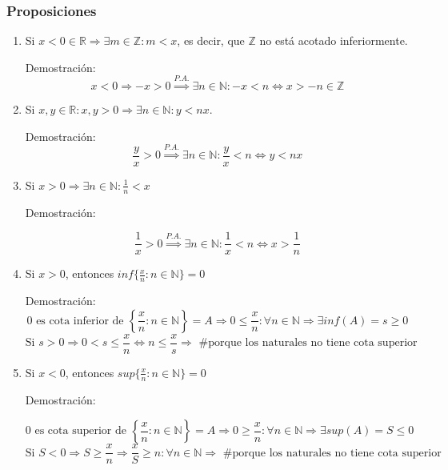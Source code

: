 \documentclass[10pt,a4paper,openright]{book}
\theoremstyle{break}
\begin{document}
\subsubsection{Proposiciones}
\begin{enumerate}
\item Si $x<0\in \mathbb R\Rightarrow \exists m\in \mathbb Z: m<x$, es decir, que $\mathbb Z$ no está acotado inferiormente.\par
Demostración:
$$x<0\Rightarrow -x>0\stackrel{P.A.}{\Rightarrow} \exists n \in \mathbb N: -x<n\Leftrightarrow x>-n\in \mathbb Z$$
\vspace{0.15cm}

\item Si $x,y\in \mathbb R: x,y>0\Rightarrow \exists n \in \mathbb N : y<nx$.\par
Demostración:
$$\frac{y}{x}>0\stackrel{P.A.}{\Rightarrow} \exists n \in \mathbb N : \frac{y}{x}<n \Leftrightarrow y<nx$$
\vspace{0.15cm}

\item Si $x>0\Rightarrow \exists n \in \mathbb N : \frac{1}{n}<x$\par
Demostración:\par
$$\frac{1}{x}>0\stackrel{P.A.}{\Rightarrow }\exists n \in \mathbb N : \frac{1}{x}<n\Leftrightarrow x>\frac{1}{n}$$			
\vspace{0.15cm}

\item Si $x>0$, entonces $inf\{\frac{x}{n}: n\in \mathbb N\}=0$\par
Demostración:
$$\mbox{0 es cota inferior de } \left\lbrace\frac{x}{n}: n\in \mathbb N\right\rbrace=A\Rightarrow 0\leq \frac{x}{n}: \forall n\in \mathbb N \Rightarrow \exists inf(A)=s\geq 0$$
$$\mbox{Si }s>0\Rightarrow 0<s\leq \frac{x}{n}\Leftrightarrow n\leq \frac{x}{s}\Rightarrow \mbox{ \# porque los naturales no tiene cota superior}$$
\vspace{0.15cm}

\item Si $x<0$, entonces $sup\{\frac{x}{n}: n\in \mathbb N\}=0$\par
Demostración:\par
$$\mbox{0 es cota superior de } \left\lbrace\frac{x}{n}: n\in \mathbb N\right\rbrace=A\Rightarrow 0\geq \frac{x}{n}: \forall n\in \mathbb N\Rightarrow \exists sup(A)=S \leq 0$$
$$\mbox{Si }S<0\Rightarrow S\geq \frac{x}{n}\Rightarrow \frac{x}{S}\geq n: \forall n \in \mathbb N\Rightarrow \mbox{ \# porque los naturales no tiene cota superior}$$
\vspace{0.15cm}


\end{enumerate}
\end{document}
